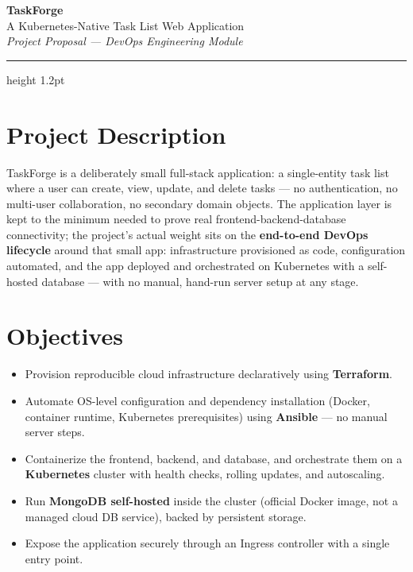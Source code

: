 \documentclass[11pt]{article}
\begin{document}

\begin{center}
  {\color{navy}\Huge\bfseries TaskForge}\\[2pt]
  {\color{accent}\large A Kubernetes-Native Task List Web Application}\\[6pt]
  {\small\itshape Project Proposal --- DevOps Engineering Module}
\end{center}

\vspace{4pt}
{\color{rulegray}\hrule height 1.2pt}
\vspace{8pt}

\section*{Project Description}
TaskForge is a deliberately small full-stack application: a single-entity task list where a user
can create, view, update, and delete tasks --- no authentication, no multi-user collaboration, no
secondary domain objects. The application layer is kept to the minimum needed to prove real
frontend-backend-database connectivity; the project's actual weight sits on the
\textbf{end-to-end DevOps lifecycle} around that small app: infrastructure provisioned as code,
configuration automated, and the app deployed and orchestrated on Kubernetes with a self-hosted
database --- with no manual, hand-run server setup at any stage.

\section*{Objectives}
\begin{itemize}
  \item Provision reproducible cloud infrastructure declaratively using \textbf{Terraform}.
  \item Automate OS-level configuration and dependency installation (Docker, container runtime,
        Kubernetes prerequisites) using \textbf{Ansible} — no manual server steps.
  \item Containerize the frontend, backend, and database, and orchestrate them on a
        \textbf{Kubernetes} cluster with health checks, rolling updates, and autoscaling.
  \item Run \textbf{MongoDB self-hosted} inside the cluster (official Docker image, not a managed
        cloud DB service), backed by persistent storage.
  \item Expose the application securely through an Ingress controller with a single entry point.
\end{itemize}
\end{document}
